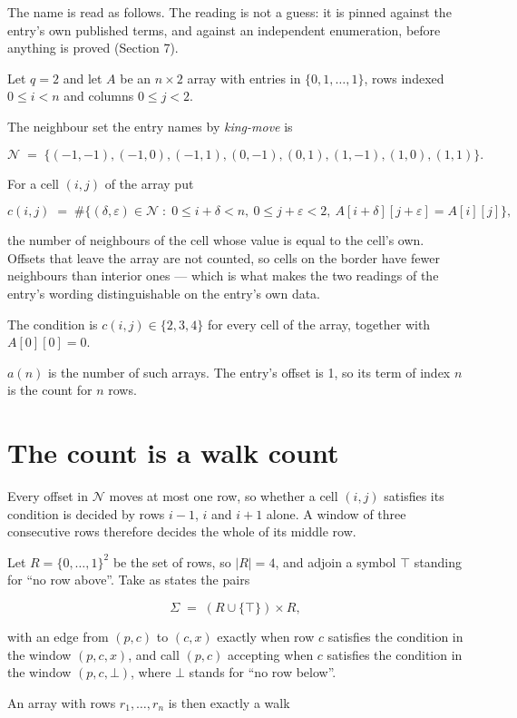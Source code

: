 \documentclass[11pt]{article}
\theoremstyle{definition}
\begin{document}
The name is read as follows. The reading is not a guess: it is pinned against the entry's own published terms, and against an independent enumeration, before anything is proved (Section 7).

Let $q = 2$ and let $A$ be an $n \times 2$ array with entries in $\{0,1,\dots,1\}$, rows indexed $0 \le i < n$ and columns $0 \le j < 2$.

The neighbour set the entry names by {\itshape king-move} is

\[\mathcal{N} \;=\; \{(-1,-1), (-1,0), (-1,1), (0,-1), (0,1), (1,-1), (1,0), (1,1)\}.\]

For a cell $(i,j)$ of the array put

\[c(i,j) \;=\; \#\bigl\{(\delta,\varepsilon)\in\mathcal{N} \;:\; 0\le i+\delta<n,\ 0\le j+\varepsilon<2,\ A[i+\delta][j+\varepsilon] = A[i][j]\bigr\},\]

the number of neighbours of the cell whose value is equal to the cell's own. Offsets that leave the array are not counted, so cells on the border have fewer neighbours than interior ones --- which is what makes the two readings of the entry's wording distinguishable on the entry's own data.

The condition is $c(i,j) \in \{2, 3, 4\}$ for every cell of the array, together with $A[0][0]=0$.

$a(n)$ is the number of such arrays. The entry's offset is 1, so its term of index $n$ is the count for $n$ rows.

\section{The count is a walk count}

Every offset in $\mathcal{N}$ moves at most one row, so whether a cell $(i,j)$ satisfies its condition is decided by rows $i-1$, $i$ and $i+1$ alone. A window of three consecutive rows therefore decides the whole of its middle row.

Let $R = \{0,\dots,1\}^{2}$ be the set of rows, so $|R| = 4$, and adjoin a symbol $\top$ standing for ``no row above''. Take as states the pairs

\[\Sigma \;=\; (R \cup \{\top\}) \times R,\]

with an edge from $(p,c)$ to $(c,x)$ exactly when row $c$ satisfies the condition in the window $(p,c,x)$, and call $(p,c)$ accepting when $c$ satisfies the condition in the window $(p,c,\bot)$, where $\bot$ stands for ``no row below''.

An array with rows $r_1,\dots,r_n$ is then exactly a walk
\end{document}
